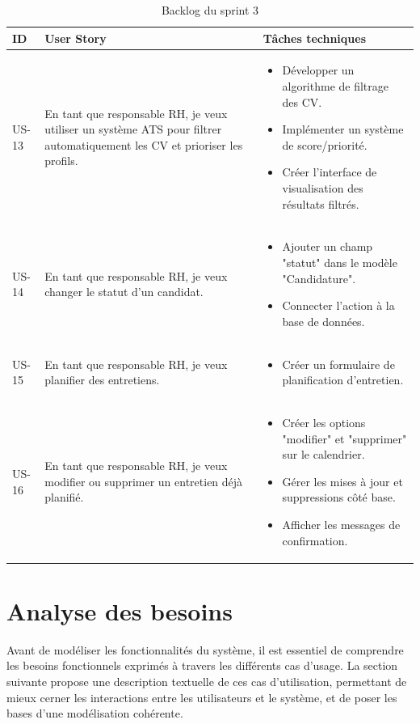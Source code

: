 \begin{table}[H]
\caption{Backlog du sprint 3}
\centering
\begin{tabular}{|p{1cm}|p{8cm}|p{8cm}|}
\hline
\textbf{ID} & \textbf{User Story} & \textbf{Tâches techniques} \\
\hline
US-13 & En tant que responsable RH, je veux utiliser un système ATS pour filtrer automatiquement les CV et prioriser les profils. 
& 
\begin{itemize}[leftmargin=*]
  \item Développer un algorithme de filtrage des CV.
  \item Implémenter un système de score/priorité.
  \item Créer l'interface de visualisation des résultats filtrés.
\end{itemize} \\
\hline
US-14 & En tant que responsable RH, je veux changer le statut d’un candidat. 
& 
\begin{itemize}[leftmargin=*]
  \item Ajouter un champ "statut" dans le modèle "Candidature".
  \item Connecter l’action à la base de données.
\end{itemize} \\
\hline
US-15 & En tant que responsable RH, je veux planifier des entretiens. 
& 
\begin{itemize}[leftmargin=*]
  \item Créer un formulaire de planification d’entretien.
\end{itemize} \\
\hline
US-16 & En tant que responsable RH, je veux modifier ou supprimer un entretien déjà planifié. 
& 
\begin{itemize}[leftmargin=*]
  \item Créer les options "modifier" et "supprimer" sur le calendrier.
  \item Gérer les mises à jour et suppressions côté base.
  \item Afficher les messages de confirmation.
\end{itemize} \\
\hline
\end{tabular}
\label{tab:sprint3_backlog}
\end{table}




\section{Analyse des besoins}
Avant de modéliser les fonctionnalités du système, il est essentiel de comprendre les besoins fonctionnels exprimés à travers les différents cas d’usage. La section suivante propose une description textuelle de ces cas d’utilisation, permettant de mieux cerner les interactions entre les utilisateurs et le système, et de poser les bases d’une modélisation cohérente. 
    
